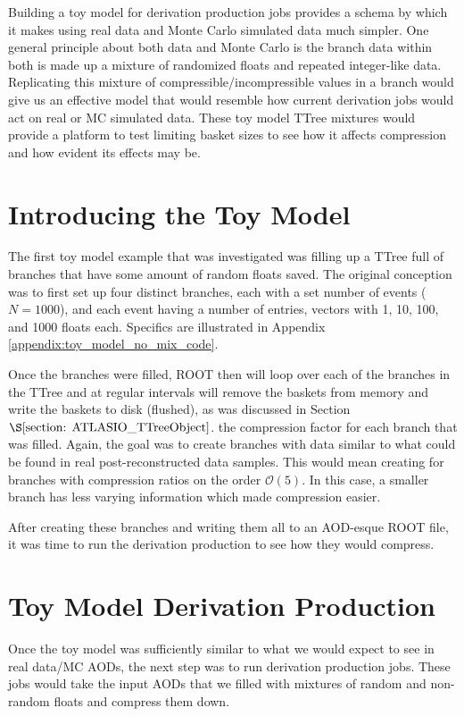 Building a toy model for derivation production jobs provides a schema by which it makes using real data and Monte Carlo simulated data much simpler.
One general principle about both data and Monte Carlo is the branch data within both is made up a mixture of randomized floats and repeated integer-like data.
Replicating this mixture of compressible/incompressible values in a branch would give us an effective model that would resemble how current derivation jobs would act on real or MC simulated data. 
These toy model TTree mixtures would provide a platform to test limiting basket sizes to see how it affects compression and how evident its effects may be. 

\section{Introducing the Toy Model}

The first toy model example that was investigated was filling up a TTree full of branches that have some amount of random floats saved.
The original conception was to first set up four distinct branches, each with a set number of events ($N=1000$), and each event having a number of entries, vectors with 1, 10, 100, and 1000 floats each.
Specifics are illustrated in Appendix \ref{appendix:toy_model_no_mix_code}.

Once the branches were filled, ROOT then will loop over each of the branches in the TTree and at regular intervals will remove the baskets from memory and write the baskets to disk (flushed), as was discussed in Section $\S \ref{section: ATLASIO_TTreeObject}$.
 the compression factor for each branch that was filled.
Again, the goal was to create branches with data similar to what could be found in real post-reconstructed data samples.
This would mean creating for branches with compression ratios on the order $\mathcal{O}(5)$. 
In this case, a smaller branch has less varying information which made compression easier.


After creating these branches and writing them all to an AOD-esque ROOT file, it was time to run the derivation production to see how they would compress. 

\section{Toy Model Derivation Production}

Once the toy model was sufficiently similar to what we would expect to see in real data/MC AODs, the next step was to run derivation production jobs. 
These jobs would take the input AODs that we filled with mixtures of random and non-random floats and compress them down. 

